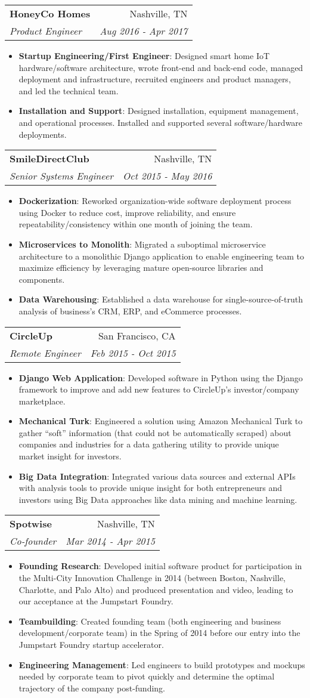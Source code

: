 \documentclass[letterpaper,10pt]{article}
\makeatletter
\newcommand{\resumeItem}[2]{
  \item\small{
    \textbf{#1}{: #2 \vspace{-2pt}}
  }
}
\newcommand{\resumeSubheading}[4]{
  \vspace{-1pt}\item
    \begin{tabular*}{0.97\textwidth}{l@{\extracolsep{\fill}}r}
      \textbf{#1} & #2 \\
      \textit{\small#3} & \textit{\small #4} \\
    \end{tabular*}\vspace{-5pt}
}
\newcommand{\resumeItemListStart}{\begin{itemize}}
\newcommand{\resumeItemListEnd}{\end{itemize}\vspace{-5pt}}
\makeatother
\begin{document}
    \resumeSubheading
      {HoneyCo Homes}{Nashville, TN}
      {Product Engineer}{Aug 2016 - Apr 2017}
      \resumeItemListStart
        \resumeItem{Startup Engineering/First Engineer}
          {Designed smart home IoT hardware/software architecture, wrote front-end and back-end code, managed deployment and infrastructure, recruited engineers and product managers, and led the technical team.}
        \resumeItem{Installation and Support}
          {Designed installation, equipment management, and operational processes. Installed and supported several software/hardware deployments.}
      \resumeItemListEnd

    \resumeSubheading
      {SmileDirectClub}{Nashville, TN}
      {Senior Systems Engineer}{Oct 2015 - May 2016}
      \resumeItemListStart
        \resumeItem{Dockerization}
          {Reworked organization-wide software deployment process using Docker to reduce cost, improve reliability, and ensure repeatability/consistency within one month of joining the team.}
        \resumeItem{Microservices to Monolith}
          {Migrated a suboptimal microservice architecture to a monolithic Django application to enable engineering team to maximize efficiency by leveraging mature open-source libraries and components.}
        \resumeItem{Data Warehousing}
          {Established a data warehouse for single-source-of-truth analysis of business's CRM, ERP, and eCommerce processes.}
      \resumeItemListEnd
      
    \resumeSubheading
      {CircleUp}{San Francisco, CA}
      {Remote Engineer}{Feb 2015 - Oct 2015}
      \resumeItemListStart
        \resumeItem{Django Web Application}
          {Developed software in Python using the Django framework to improve and add new features to CircleUp’s investor/company marketplace.}
        \resumeItem{Mechanical Turk}
          {Engineered a solution using Amazon Mechanical Turk to gather “soft” information (that could not be automatically scraped) about companies and industries for a data gathering utility to provide unique market insight for investors.}
        \resumeItem{Big Data Integration}
          {Integrated various data sources and external APIs with analysis tools to provide unique insight for both entrepreneurs and investors using Big Data approaches like data mining and machine learning.}
      \resumeItemListEnd

    \resumeSubheading
      {Spotwise}{Nashville, TN}
      {Co-founder}{Mar 2014 - Apr 2015}
      \resumeItemListStart
        \resumeItem{Founding Research}
          {Developed initial software product for participation in the Multi-City Innovation Challenge in 2014 (between Boston, Nashville, Charlotte, and Palo Alto) and produced presentation and video, leading to our acceptance at the Jumpstart Foundry.}
        \resumeItem{Teambuilding}
          {Created founding team (both engineering and business development/corporate team) in the Spring of 2014 before our entry into the Jumpstart Foundry startup accelerator.}
        \resumeItem{Engineering Management}
          {Led engineers to build prototypes and mockups needed by corporate team to pivot quickly and determine the optimal trajectory of the company post-funding.}
      \resumeItemListEnd
\end{document}
